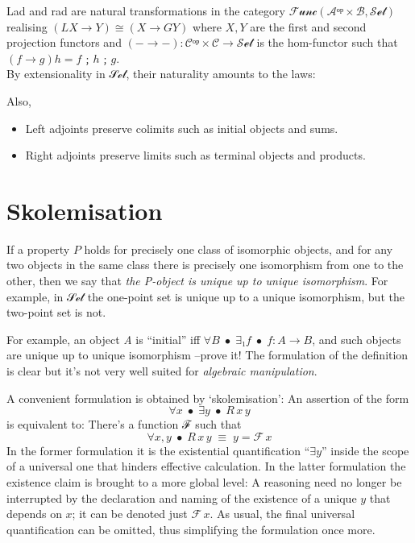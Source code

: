 \documentclass[11pt]{article}
\begin{document}
\vspace{2ex}
Lad and rad are natural transformations in the category $ℱ𝓊𝓃𝒸(𝒜ᵒᵖ × ℬ, 𝒮ℯ𝓉)$ realising
$(L X → Y) ≅ (X → G Y)$ where $X, Y$ are the first and second projection functors
and $(-→-) : 𝒞ᵒᵖ × 𝒞 → 𝒮ℯ𝓉$ is the hom-functor such that $(f → g) h = f ﹔ h ﹔ g$.
\\ By extensionality in 𝒮ℯ𝓉, their naturality amounts to the laws:



\room
\endeqns

Also,
\begin{itemize}
\item Left adjoints preserve colimits such as initial objects and sums.
\item Right adjoints preserve limits such as terminal objects and products.
\end{itemize}

\section{Skolemisation}
\label{sec:org3a849b2}
If a property \(P\) holds for precisely one class of isomorphic objects,
and for any two objects in the same class there is precisely one
isomorphism from one to the other, then we say that
\emph{the P-object is unique up to unique isomorphism}. 
For example, in 𝒮ℯ𝓉 the one-point set is unique up to a unique isomorphism,
but the two-point set is not.

\room

For example, an object \emph{A} is ``initial'' iff
\(∀ B  \;•\;  ∃₁ f  \;•\;  f : A → B\), and such objects are unique
up to unique isomorphism --prove it!
The formulation of the definition is clear but it's not very well suited for \emph{algebraic manipulation}.

\room

A convenient formulation is obtained by `skolemisation': An assertion of the form
\[ ∀ x \;•\; ∃ y \;•\; R \, x \, y \]
is equivalent to: There's a function ℱ such that
\[ ∀ x, y \;•\; R \, x \, y \;≡\; y = ℱ\, x  \]
In the former formulation it is the existential quantification “\(∃ y\)” inside the scope of a universal
one that hinders effective calculation. In the latter formulation the existence claim is brought to a
more global level: A reasoning need no longer be interrupted by the declaration and naming of the
existence of a unique \(y\) that depends on \(x\); it can be denoted just \(ℱ\, x\).
As usual, the final universal quantification can be omitted, thus simplifying the formulation once more.
\end{document}
